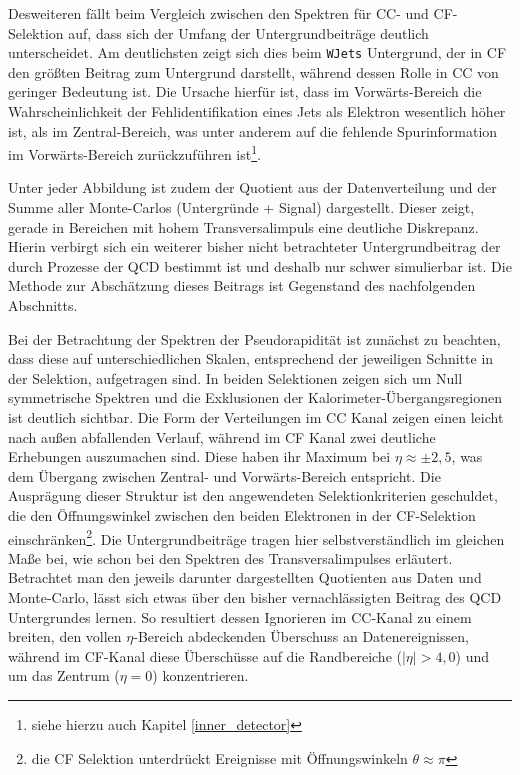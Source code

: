Desweiteren fällt beim Vergleich zwischen den Spektren für \ac{CC}- und
\ac{CF}-Selektion auf, dass sich der Umfang der Untergrundbeiträge deutlich 
unterscheidet. Am deutlichsten zeigt sich dies beim \texttt{WJets}
Untergrund, der in \ac{CF} den größten Beitrag zum Untergrund darstellt,
während dessen Rolle in \ac{CC} von geringer Bedeutung ist. Die Ursache
hierfür ist, dass im Vorwärts-Bereich die Wahrscheinlichkeit der
Fehlidentifikation eines Jets als Elektron wesentlich höher ist, als im
Zentral-Bereich, was unter anderem auf die fehlende Spurinformation im
Vorwärts-Bereich zurückzuführen ist\footnote{siehe hierzu auch Kapitel
\ref{inner_detector}}.

Unter jeder Abbildung ist zudem der Quotient aus der Datenverteilung und der
Summe aller Monte-Carlos (Untergründe + Signal) dargestellt. Dieser zeigt, gerade
in Bereichen mit hohem Transversalimpuls eine deutliche Diskrepanz. Hierin
verbirgt sich ein weiterer bisher nicht betrachteter Untergrundbeitrag der durch
Prozesse der \ac{QCD} bestimmt ist und deshalb nur schwer simulierbar ist. Die
Methode zur Abschätzung dieses Beitrags ist Gegenstand des nachfolgenden
Abschnitts.

Bei der Betrachtung der Spektren der Pseudorapidität ist zunächst zu beachten,
dass diese auf unterschiedlichen Skalen, entsprechend der jeweiligen Schnitte
in der Selektion, aufgetragen sind. In beiden Selektionen zeigen sich
um Null symmetrische Spektren und die Exklusionen der
Kalorimeter-Übergangsregionen ist deutlich sichtbar. Die Form der Verteilungen
im \ac{CC} Kanal zeigen einen leicht nach außen abfallenden Verlauf, während im
\ac{CF} Kanal zwei deutliche Erhebungen auszumachen sind. Diese haben ihr
Maximum bei $\eta\approx\pm 2,5$, was dem Übergang zwischen Zentral- und
Vorwärts-Bereich entspricht. Die Ausprägung dieser Struktur ist den
angewendeten Selektionkriterien geschuldet, die den Öffnungswinkel
zwischen den beiden Elektronen in der \ac{CF}-Selektion
einschränken\footnote{die \ac{CF} Selektion unterdrückt Ereignisse mit
Öffnungswinkeln $\theta \approx \pi$}. Die Untergrundbeiträge tragen hier
selbstverständlich im gleichen Maße bei, wie schon bei den Spektren des
Transversalimpulses erläutert. Betrachtet man den jeweils darunter dargestellten
Quotienten aus Daten und Monte-Carlo, lässt sich etwas über den bisher
vernachlässigten Beitrag des \ac{QCD} Untergrundes lernen. So resultiert
dessen Ignorieren im \ac{CC}-Kanal zu einem breiten, den vollen $\eta$-Bereich
abdeckenden Überschuss an Datenereignissen, während im \ac{CF}-Kanal diese
Überschüsse auf die Randbereiche ($|\eta| > 4,0$) und um das Zentrum ($\eta=0$)
konzentrieren.



